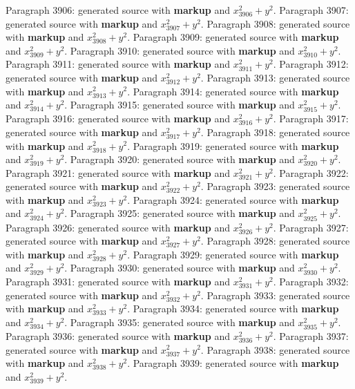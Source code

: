 \documentclass{article}
\begin{document}
Paragraph 3906: generated source with \textbf{markup} and $x_{3906}^2 + y^2$.
Paragraph 3907: generated source with \textbf{markup} and $x_{3907}^2 + y^2$.
Paragraph 3908: generated source with \textbf{markup} and $x_{3908}^2 + y^2$.
Paragraph 3909: generated source with \textbf{markup} and $x_{3909}^2 + y^2$.
Paragraph 3910: generated source with \textbf{markup} and $x_{3910}^2 + y^2$.
Paragraph 3911: generated source with \textbf{markup} and $x_{3911}^2 + y^2$.
Paragraph 3912: generated source with \textbf{markup} and $x_{3912}^2 + y^2$.
Paragraph 3913: generated source with \textbf{markup} and $x_{3913}^2 + y^2$.
Paragraph 3914: generated source with \textbf{markup} and $x_{3914}^2 + y^2$.
Paragraph 3915: generated source with \textbf{markup} and $x_{3915}^2 + y^2$.
Paragraph 3916: generated source with \textbf{markup} and $x_{3916}^2 + y^2$.
Paragraph 3917: generated source with \textbf{markup} and $x_{3917}^2 + y^2$.
Paragraph 3918: generated source with \textbf{markup} and $x_{3918}^2 + y^2$.
Paragraph 3919: generated source with \textbf{markup} and $x_{3919}^2 + y^2$.
Paragraph 3920: generated source with \textbf{markup} and $x_{3920}^2 + y^2$.
Paragraph 3921: generated source with \textbf{markup} and $x_{3921}^2 + y^2$.
Paragraph 3922: generated source with \textbf{markup} and $x_{3922}^2 + y^2$.
Paragraph 3923: generated source with \textbf{markup} and $x_{3923}^2 + y^2$.
Paragraph 3924: generated source with \textbf{markup} and $x_{3924}^2 + y^2$.
Paragraph 3925: generated source with \textbf{markup} and $x_{3925}^2 + y^2$.
Paragraph 3926: generated source with \textbf{markup} and $x_{3926}^2 + y^2$.
Paragraph 3927: generated source with \textbf{markup} and $x_{3927}^2 + y^2$.
Paragraph 3928: generated source with \textbf{markup} and $x_{3928}^2 + y^2$.
Paragraph 3929: generated source with \textbf{markup} and $x_{3929}^2 + y^2$.
Paragraph 3930: generated source with \textbf{markup} and $x_{3930}^2 + y^2$.
Paragraph 3931: generated source with \textbf{markup} and $x_{3931}^2 + y^2$.
Paragraph 3932: generated source with \textbf{markup} and $x_{3932}^2 + y^2$.
Paragraph 3933: generated source with \textbf{markup} and $x_{3933}^2 + y^2$.
Paragraph 3934: generated source with \textbf{markup} and $x_{3934}^2 + y^2$.
Paragraph 3935: generated source with \textbf{markup} and $x_{3935}^2 + y^2$.
Paragraph 3936: generated source with \textbf{markup} and $x_{3936}^2 + y^2$.
Paragraph 3937: generated source with \textbf{markup} and $x_{3937}^2 + y^2$.
Paragraph 3938: generated source with \textbf{markup} and $x_{3938}^2 + y^2$.
Paragraph 3939: generated source with \textbf{markup} and $x_{3939}^2 + y^2$.
\end{document}
